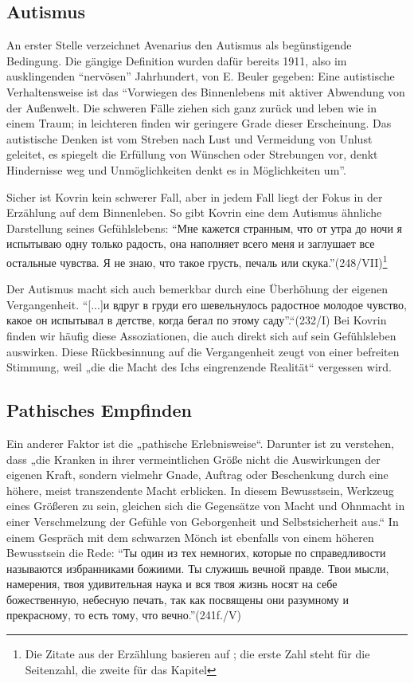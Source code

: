 \documentclass[12pt,headsepline,a4paper]{scrartcl}
\newcommand\textcyr[1]{{\fontencoding{OT2}\fontfamily{wncyr}\selectfont ``#1''}}
\begin{document}
\subsection{Autismus}
An erster Stelle verzeichnet Avenarius den Autismus als begünstigende Bedingung. Die gängige
Definition wurden dafür bereits 1911, also im ausklingenden ``nervösen'' Jahrhundert, von E.
Beuler gegeben: Eine autistische Verhaltensweise ist das ``Vorwiegen des Binnenlebens mit aktiver
Abwendung von der Außenwelt. Die schweren Fälle ziehen sich ganz zurück und leben wie in
einem Traum; in leichteren finden wir geringere Grade dieser Erscheinung. Das autistische Denken
ist vom Streben nach Lust und Vermeidung von Unlust geleitet, es spiegelt die Erfüllung von
Wünschen oder Strebungen vor, denkt Hindernisse weg und Unmöglichkeiten denkt es in
Möglichkeiten um''\autocite[38]{avenarius}. 

Sicher ist Kovrin kein schwerer Fall, aber in jedem Fall liegt der Fokus in der
Erzählung auf dem Binnenleben. So gibt Kovrin eine dem Autismus ähnliche Darstellung seines
Gefühlslebens: \textcyr{Мне кажется странным, что от утра до ночи я испытываю одну только
радость, она наполняет всего меня и заглушает все остальные чувства. Я не знаю, что такое
грусть, печаль или скука.}(248/VII)\footnote{Die Zitate aus der Erzählung basieren auf \autocite{blackmonk} 
; die erste Zahl steht für die Seitenzahl, die zweite für das Kapitel}

Der Autismus macht sich auch bemerkbar durch eine Überhöhung der eigenen Vergangenheit.
\textcyr{[...]и вдруг в груди его шевельнулось радостное молодое чувство, какое он испытывал в
детстве, когда бегал по этому саду}.“(232/I) Bei Kovrin finden wir häufig diese Assoziationen,
die auch direkt sich auf sein Gefühlsleben auswirken. Diese Rückbesinnung auf die Vergangenheit
zeugt von einer befreiten Stimmung, weil „die die Macht des Ichs eingrenzende Realität“\autocite[85]{avenarius}
vergessen wird.
\subsection{Pathisches Empfinden}
Ein anderer Faktor ist die „pathische Erlebnisweise“. Darunter ist zu verstehen, dass „die Kranken
in ihrer vermeintlichen Größe nicht die Auswirkungen der eigenen Kraft, sondern vielmehr Gnade,
Auftrag oder Beschenkung durch eine höhere, meist transzendente Macht erblicken. In diesem
Bewusstsein, Werkzeug eines Größeren zu sein, gleichen sich die Gegensätze von Macht und
Ohnmacht in einer Verschmelzung der Gefühle von Geborgenheit und Selbstsicherheit aus.“\autocite[48]{avenarius} In
einem Gespräch mit dem schwarzen Mönch ist ebenfalls von einem höheren Bewusstsein die Rede:
\textcyr{Ты один из тех немногих, которые по справедливости называются избранниками божиими.
Ты служишь вечной правде. Твои мысли, намерения, твоя удивительная наука и вся твоя
жизнь носят на себе божественную, небесную печать, так как посвящены они разумному и
прекрасному, то есть тому, что вечно.}(241f./V)
\end{document}
